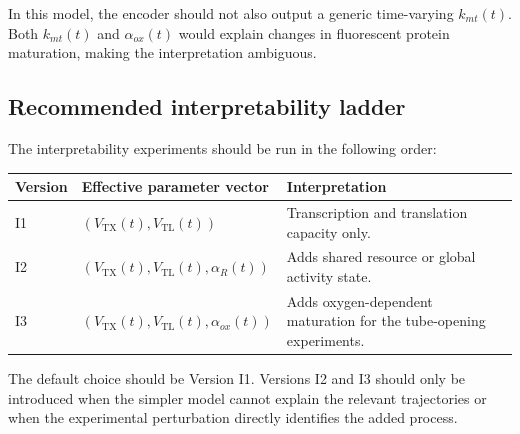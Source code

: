 \documentclass[11pt]{article}
\newcommand{\TX}{\mathrm{TX}}
\newcommand{\TL}{\mathrm{TL}}
\begin{document}
In this model, the encoder should not also output a generic time-varying $k_{mt}(t)$. Both $k_{mt}(t)$ and $\alpha_{ox}(t)$ would explain changes in fluorescent protein maturation, making the interpretation ambiguous.

\subsection{Recommended interpretability ladder}

The interpretability experiments should be run in the following order:

\begin{center}
\begin{tabularx}{\textwidth}{llX}
\toprule
Version & Effective parameter vector & Interpretation \\
\midrule
I1 & $\left(V_{\TX}(t),V_{\TL}(t)\right)$
& Transcription and translation capacity only. \\
I2 & $\left(V_{\TX}(t),V_{\TL}(t),\alpha_R(t)\right)$
& Adds shared resource or global activity state. \\
I3 & $\left(V_{\TX}(t),V_{\TL}(t),\alpha_{ox}(t)\right)$
& Adds oxygen-dependent maturation for the tube-opening experiments. \\
\bottomrule
\end{tabularx}
\end{center}

The default choice should be Version I1. Versions I2 and I3 should only be introduced when the simpler model cannot explain the relevant trajectories or when the experimental perturbation directly identifies the added process.
\end{document}
